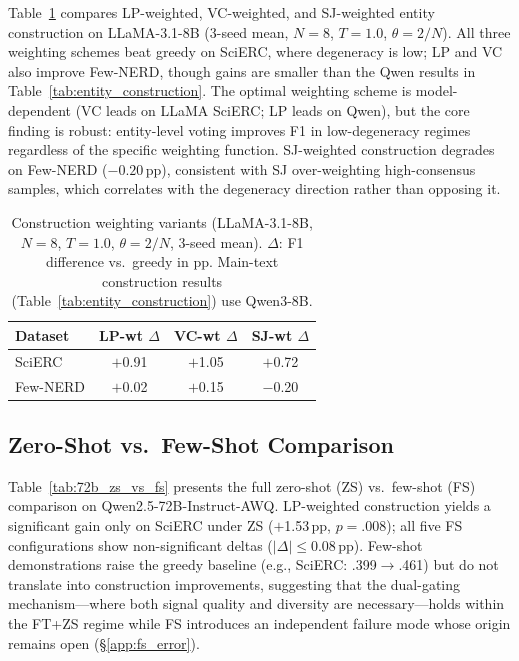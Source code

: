 Table~\ref{tab:weighting_variants} compares LP-weighted, VC-weighted, and SJ-weighted entity construction on LLaMA-3.1-8B (3-seed mean, $N{=}8$, $T{=}1.0$, $\theta{=}2/N$).
All three weighting schemes beat greedy on SciERC, where degeneracy is low; LP and VC also improve Few-NERD, though gains are smaller than the Qwen results in Table~\ref{tab:entity_construction}.
The optimal weighting scheme is model-dependent (VC leads on LLaMA SciERC; LP leads on Qwen), but the core finding is robust: entity-level voting improves F1 in low-degeneracy regimes regardless of the specific weighting function.
SJ-weighted construction degrades on Few-NERD ($-0.20$\,pp), consistent with SJ over-weighting high-consensus samples, which correlates with the degeneracy direction rather than opposing it.

\begin{table}[h]
\centering
\small
\caption{Construction weighting variants (LLaMA-3.1-8B, $N{=}8$, $T{=}1.0$, $\theta{=}2/N$, 3-seed mean). $\Delta$: F1 difference vs.\ greedy in pp. Main-text construction results (Table~\ref{tab:entity_construction}) use Qwen3-8B.}
\label{tab:weighting_variants}
\begin{tabular}{lccc}
\toprule
Dataset & LP-wt $\Delta$ & VC-wt $\Delta$ & SJ-wt $\Delta$ \\
\midrule
SciERC & $+$0.91 & $+$1.05 & $+$0.72 \\
Few-NERD & $+$0.02 & $+$0.15 & $-$0.20 \\
\bottomrule
\end{tabular}
\end{table}

\subsection{Zero-Shot vs.\ Few-Shot Comparison}\label{app:zs_vs_fs}

Table~\ref{tab:72b_zs_vs_fs} presents the full zero-shot (ZS) vs.\ few-shot (FS) comparison on Qwen2.5-72B-Instruct-AWQ.
LP-weighted construction yields a significant gain only on SciERC under ZS ($+$1.53\,pp, $p{=}.008$); all five FS configurations show non-significant deltas ($|{\Delta}| \leq 0.08$\,pp).
Few-shot demonstrations raise the greedy baseline (e.g., SciERC: .399$\to$.461) but do not translate into construction improvements, suggesting that the dual-gating mechanism---where both signal quality and diversity are necessary---holds within the FT+ZS regime while FS introduces an independent failure mode whose origin remains open (\S\ref{app:fs_error}).

